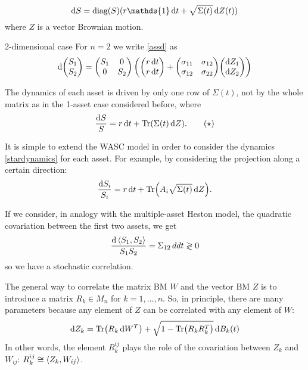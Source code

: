 \begin{equation}\label{assd}
    \dd S = \diag{S}(r\mathds{1}\,\dd t + \sqrt{\Sigma(t)}\,\dd Z(t))
\end{equation}
where $Z$ is a vector Brownian motion.
\begin{example}{2-dimensional case}{}{}
    For $n=2$ we write \eqref{assd} as
    \begin{align*}
        \dd\mqty(S_1 \\ S_2) = \mqty(S_1 & 0 \\ 0 & S_2)\left(\mqty(r\,\dd t \\ r\,\dd t) + \mqty(\sigma_{11} & \sigma_{12} \\ \sigma_{12} & \sigma_{22})\mqty(\dd Z_1 \\ \dd Z_2)\right)
    \end{align*}
\end{example}
\begin{remark}
    The dynamics of each asset is driven by only one row of $\Sigma(t)$, not by the whole matrix as in the 1-asset case considered before, where
    \begin{align}\label{stardynamics}
        \frac{\dd S}{S} = r\,\dd t + \Tr(\Sigma(t)\,\dd Z). \tag{$\star$}
    \end{align}
\end{remark}
\begin{remark}
    It is simple to extend the WASC model in order to consider the dynamics \eqref{stardynamics} for each asset. For example, by considering the projection along a certain direction:
    \begin{align*}
        \dfrac{\dd S_i}{S_i} = r\,\dd t + \Tr(A_i\sqrt{\Sigma(t)}\,\dd Z).
    \end{align*}
\end{remark}
\begin{remark}
    If we consider, in analogy with the multiple-asset Heston model, the quadratic covariation between the first two assets, we get
    \begin{align*}
        \frac{\dd\expval{S_1,S_2}}{S_1S_2} = \Sigma_{12} \,dd t \gtrless 0
    \end{align*}
    so we have a stochastic correlation.
\end{remark}
\begin{remark}
    The general way to correlate the matrix BM $W$ and the vector BM $Z$ is to introduce a matrix $R_k\in M_n$ for $k=1,\dots,n$. So, in principle, there are many parameters because any element of $Z$ can be correlated with any element of $W$:
    \begin{align}
        \dd Z_k = \Tr(R_k\,\dd W^T) + \sqrt{1-\Tr(R_kR_k^T)}\,\dd B_k(t)
    \end{align}
    In other words, the element $R_k^{ij}$ plays the role of the covariation between $Z_k$ and $W_{ij}$: $R_k^{ij} \cong \expval{Z_k, W_{ij}}$.
\end{remark}
